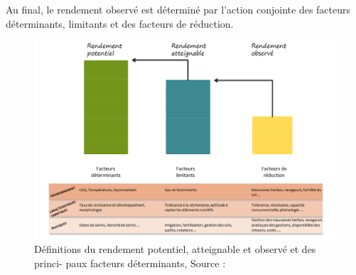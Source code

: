 \vspace{5mm}

Au final, le rendement observé est déterminé par l’action conjointe des facteurs
déterminants, limitants et des facteurs de réduction.

\begin{figure}[htbp]
 \begin{center}
  \includegraphics[scale=0.3]{synthese_biblio/facteurs_rendements.png} 
 \end{center}
 \caption[Types de rendements et facteurs déterminants]{Définitions du rendement potentiel, atteignable et observé et des princi-
paux facteurs déterminants, Source : \citet{Leroux2015}}
 \label{facteurs}
\end{figure}

\vspace{5mm}


